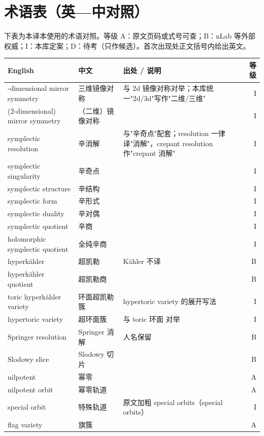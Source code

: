 \section*{术语表（英—中对照）}

下表为本译本使用的术语对照。等级 A：原文页码或式号可查；B：nLab 等外部权威；I：本库定案；D：待考（只作候选）。首次出现处正文括号内给出英文。

\begin{longtable}{@{}>{\raggedright\arraybackslash}p{}>{\raggedright\arraybackslash}p{}>{\raggedright\arraybackslash}p{}@{\quad}r@{}}
\toprule
English & 中文 & 出处 / 说明 & 等级\\
\midrule
\endhead
3-dimensional mirror symmetry & 三维镜像对称 & 与 2d 镜像对称对举；本库统一"2d/3d"写作"二维/三维" & I\\
(2-dimensional) mirror symmetry & （二维）镜像对称 &  & I\\
symplectic resolution & 辛消解 & 与"辛奇点"配套；resolution 一律译"消解"，crepant resolution 作"crepant 消解" & I\\
symplectic singularity & 辛奇点 &  & I\\
symplectic structure & 辛结构 &  & I\\
symplectic form & 辛形式 &  & I\\
symplectic duality & 辛对偶 &  & I\\
symplectic quotient & 辛商 &  & I\\
holomorphic symplectic quotient & 全纯辛商 &  & I\\
hyperkähler & 超凯勒 & Kähler 不译 & B\\
hyperkähler quotient & 超凯勒商 &  & B\\
toric hyperkähler variety & 环面超凯勒簇 & hypertoric variety 的展开写法 & I\\
hypertoric variety & 超环面簇 & 与 toric 环面 对举 & I\\
Springer resolution & Springer 消解 & 人名保留 & B\\
Slodowy slice & Slodowy 切片 &  & B\\
nilpotent & 幂零 &  & A\\
nilpotent orbit & 幂零轨道 &  & A\\
special orbit & 特殊轨道 & 原文加粗 special orbits（special orbits） & I\\
flag variety & 旗簇 &  & A\\

\end{longtable}
